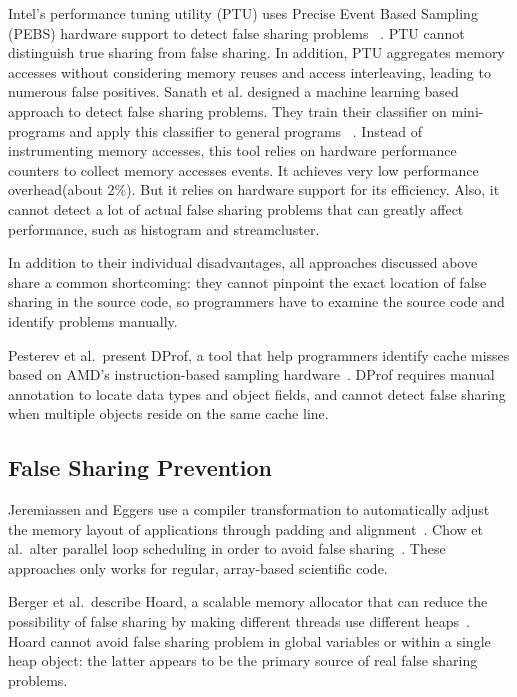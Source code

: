 Intel's performance tuning utility (PTU) uses Precise Event Based Sampling (PEBS) hardware support to detect false sharing problems ~\cite{detect:ptu, detect:intel}.  PTU cannot distinguish true sharing from false sharing. In addition, PTU aggregates memory accesses without considering memory reuses and access interleaving, leading to numerous false positives. Sanath et al. designed a machine learning based approach to detect false sharing problems. They train their classifier on mini-programs and apply this classifier to general programs ~\cite{mldetect}. Instead of instrumenting memory accesses, this tool relies on hardware performance counters to collect memory accesses events. It achieves very low performance overhead(about 2\%). But it relies on hardware support for its efficiency.  Also, it cannot detect a lot of actual false sharing problems that can greatly affect performance, such as histogram and streamcluster. 

In addition to their individual disadvantages,
all approaches discussed above share a common shortcoming:  
they cannot pinpoint the exact location of false sharing in the source code, so programmers have to examine the source code and identify problems manually.

Pesterev et al.\ present DProf, a tool that help programmers identify cache misses based on AMD's instruction-based sampling hardware~\cite{DProf}. DProf requires manual annotation to locate data types and object fields, and cannot detect false sharing when multiple objects reside on the same cache line.

\subsection{False Sharing Prevention}
\label{sec:fspreventwork}
Jeremiassen and Eggers use a compiler transformation to automatically adjust the memory layout of applications through padding and alignment~\cite{falseshare:compile}. Chow et al.\ alter parallel loop scheduling in order to avoid false
sharing~\cite{falseshare:schedule}. These approaches only works for regular, array-based scientific code.

Berger et al.\ describe Hoard, a scalable memory allocator that can reduce the possibility of false sharing by making different threads use different heaps~\cite{Hoard}. Hoard cannot avoid false sharing problem in global variables or within
a single heap object: the latter appears to be the primary source of real false sharing problems.

